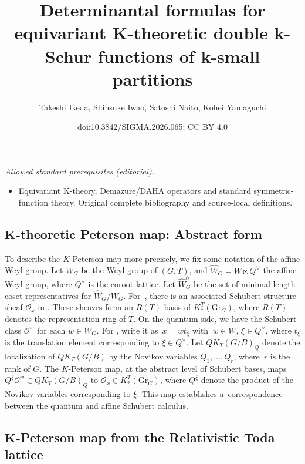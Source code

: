 \documentclass[10pt,a4paper]{amsart}
\title{Determinantal formulas for equivariant K-theoretic double k-Schur functions of k-small partitions}
\author{Takeshi Ikeda, Shinsuke Iwao, Satoshi Naito, Kohei Yamaguchi}
\date{doi:10.3842/SIGMA.2026.065; CC BY 4.0}
\numberwithin{equation}{section}
\newcommand{\Gr}{\mathrm{Gr}}
\newcommand{\Rep}{{R(T)}}
\theoremstyle{definition}
\begin{document}
\maketitle
\noindent\textit{Allowed standard prerequisites (editorial).}\begin{itemize}
\item Equivariant K-theory, Demazure/DAHA operators and standard symmetric-function theory. Original complete bibliography and source-local definitions.
\end{itemize}\medskip
\subsection[K-theoretic Peterson map: abstract form]{$\boldsymbol{K}$-theoretic Peterson map: Abstract form}
To describe the $K$-Peterson map more precisely, we fix some notation of the affine Weyl group.
Let $W_G$ be the Weyl group of $(G,T)$, and $\hat{W}_G=W\ltimes Q^\vee$ the affine Weyl group,
 where $Q^\vee$ is the coroot lattice.
 Let $\hat{W}_G^0$ be the set of minimal-length coset representatives for
 $\hat{W}_G/W_G$. For~, there is
 an associated Schubert structure sheaf $\mathscr{O}_x$ in \smash{$K_*^T(\Gr_{G})$}.
 These sheaves form an $\Rep$-basis of $K_*^T(\Gr_{G})$, where $\Rep$ denotes the representation ring of $T$.
On the quantum side, we have the Schubert class $\mathscr{O}^w$ for each $w\in W_G$.
 For ,
 write it as~${x=wt_\xi}$ with~${w\in W}$, $\xi\in Q^\vee$,
 where $t_\xi$ is the translation element corresponding to $\xi\in Q^\vee$.
 Let $QK_T(G/B)_Q$ denote the localization of $QK_T(G/B)$ by
 the Novikov variables $Q_1,\dots,Q_r$, where~$r$ is the rank of $G$.
 The $K$-Peterson map, at the abstract level of Schubert bases,
maps $Q^\xi\mathscr{O}^w \in QK_T(G/B)_Q$ to $\mathscr{O}_{x}\in K_*^T(\Gr_G)$, where $Q^\xi$ denote the product of the Novikov variables corresponding to $\xi$. This map establishes a~correspondence between the quantum and affine Schubert calculus.

\subsection[K-Peterson map from the Relativistic Toda lattice]{$\boldsymbol{K}$-Peterson map from the Relativistic Toda lattice}
\end{document}

